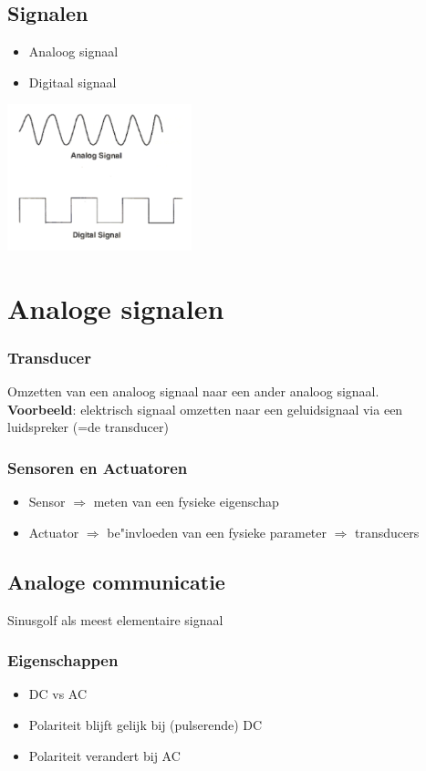 \documentclass{article}
\newcommand{\bold}[1]{\textbf{#1}}
\begin{document}
\subsection{Signalen}
\begin{itemize}
    \item Analoog signaal
    \item Digitaal signaal
\end{itemize}

\includegraphics[width=0.4\textwidth]{Screenshot_20200217_115642.png}

\section{Analoge signalen}

\subsubsection{Transducer}
Omzetten van een analoog signaal naar een ander analoog signaal.\\
\bold{Voorbeeld}: elektrisch signaal omzetten naar een geluidsignaal via een luidspreker (=de transducer)

\subsubsection{Sensoren en Actuatoren}
\begin{itemize}
    \item Sensor $\Rightarrow$ meten van een fysieke eigenschap
    \item Actuator $\Rightarrow$ be"invloeden van een fysieke parameter $\Rightarrow$ transducers 
\end{itemize}

\subsection{Analoge communicatie}
Sinusgolf als meest elementaire signaal

\subsubsection{Eigenschappen}
\begin{itemize}
    \item DC vs AC
    \item Polariteit blijft gelijk bij (pulserende) DC
    \item Polariteit verandert bij AC
\end{itemize}
\end{document}
